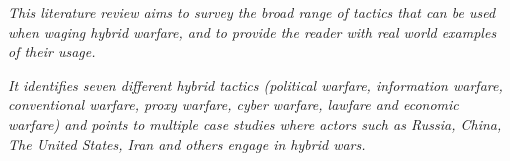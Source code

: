 \textit{This literature review aims to survey the broad range of tactics that can be
used when waging hybrid warfare, and to provide the reader with real world
examples of their usage. }

\textit{It identifies seven different hybrid tactics (political warfare, information
warfare, conventional warfare, proxy warfare, cyber warfare, lawfare and
economic warfare) and points to multiple case studies where actors such as
Russia, China, The United States, Iran and others engage in hybrid wars. }
